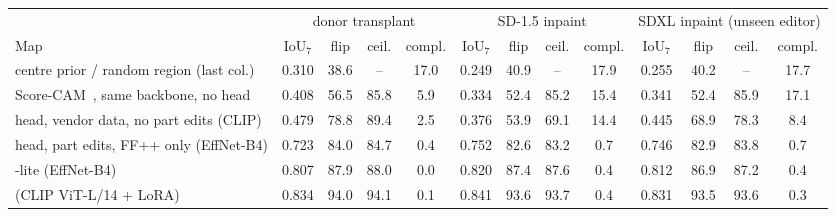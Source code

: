 \begin{tabular}{l cccc cccc cccc}
\toprule
 & \multicolumn{4}{c}{donor transplant} & \multicolumn{4}{c}{SD-1.5 inpaint} & \multicolumn{4}{c}{SDXL inpaint (unseen editor)} \\
\cmidrule(lr){2-5}\cmidrule(lr){6-9}\cmidrule(lr){10-13}
Map & IoU$_7$ & flip & ceil. & compl. & IoU$_7$ & flip & ceil. & compl. & IoU$_7$ & flip & ceil. & compl. \\
\midrule
centre prior / random region (last col.) & 0.310 & 38.6 & -- & 17.0 & 0.249 & 40.9 & -- & 17.9 & 0.255 & 40.2 & -- & 17.7 \\
\midrule
Score-CAM~\cite{scorecam}, same backbone, no head & 0.408 & 56.5 & 85.8 & 5.9 & 0.334 & 52.4 & 85.2 & 15.4 & 0.341 & 52.4 & 85.9 & 17.1 \\
head, vendor data, no part edits (CLIP) & 0.479 & 78.8 & 89.4 & 2.5 & 0.376 & 53.9 & 69.1 & 14.4 & 0.445 & 68.9 & 78.3 & 8.4 \\
head, part edits, FF++ only (EffNet-B4) & 0.723 & 84.0 & 84.7 & 0.4 & 0.752 & 82.6 & 83.2 & 0.7 & 0.746 & 82.9 & 83.8 & 0.7 \\
\ours{}-lite (EffNet-B4) & 0.807 & 87.9 & 88.0 & 0.0 & 0.820 & 87.4 & 87.6 & 0.4 & 0.812 & 86.9 & 87.2 & 0.4 \\
\textbf{\ours{}} (CLIP ViT-L/14 + LoRA) & 0.834 & 94.0 & 94.1 & 0.1 & 0.841 & 93.6 & 93.7 & 0.4 & 0.831 & 93.5 & 93.6 & 0.3 \\
\bottomrule
\end{tabular}
